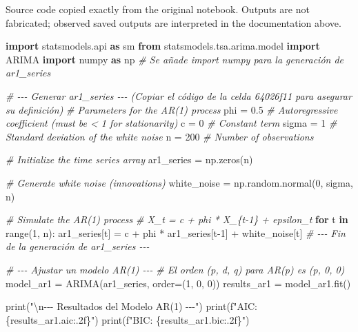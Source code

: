 \documentclass[
  11pt,
]{article}
\newenvironment{Shaded}{}{}
\newcommand{\BuiltInTok}[1]{\textcolor[rgb]{0.00,0.50,0.00}{#1}}
\newcommand{\CharTok}[1]{\textcolor[rgb]{0.25,0.44,0.63}{#1}}
\newcommand{\CommentTok}[1]{\textcolor[rgb]{0.38,0.63,0.69}{\textit{#1}}}
\newcommand{\ControlFlowTok}[1]{\textcolor[rgb]{0.00,0.44,0.13}{\textbf{#1}}}
\newcommand{\DecValTok}[1]{\textcolor[rgb]{0.25,0.63,0.44}{#1}}
\newcommand{\FloatTok}[1]{\textcolor[rgb]{0.25,0.63,0.44}{#1}}
\newcommand{\ImportTok}[1]{\textcolor[rgb]{0.00,0.50,0.00}{\textbf{#1}}}
\newcommand{\KeywordTok}[1]{\textcolor[rgb]{0.00,0.44,0.13}{\textbf{#1}}}
\newcommand{\NormalTok}[1]{#1}
\newcommand{\OperatorTok}[1]{\textcolor[rgb]{0.40,0.40,0.40}{#1}}
\newcommand{\SpecialCharTok}[1]{\textcolor[rgb]{0.25,0.44,0.63}{#1}}
\newcommand{\SpecialStringTok}[1]{\textcolor[rgb]{0.73,0.40,0.53}{#1}}
\newcommand{\StringTok}[1]{\textcolor[rgb]{0.25,0.44,0.63}{#1}}
\begin{document}
Source code copied exactly from the original notebook. Outputs are not fabricated; observed saved outputs are interpreted in the documentation above.

\begin{Shaded}
\begin{Highlighting}[]
\ImportTok{import}\NormalTok{ statsmodels.api }\ImportTok{as}\NormalTok{ sm}
\ImportTok{from}\NormalTok{ statsmodels.tsa.arima.model }\ImportTok{import}\NormalTok{ ARIMA}
\ImportTok{import}\NormalTok{ numpy }\ImportTok{as}\NormalTok{ np }\CommentTok{\# Se añade import numpy para la generación de ar1\_series}

\CommentTok{\# {-}{-}{-} Generar ar1\_series {-}{-}{-} (Copiar el código de la celda 64026f11 para asegurar su definición)}
\CommentTok{\# Parameters for the AR(1) process}
\NormalTok{phi }\OperatorTok{=} \FloatTok{0.5}  \CommentTok{\# Autoregressive coefficient (must be \textless{} 1 for stationarity)}
\NormalTok{c }\OperatorTok{=} \DecValTok{0}    \CommentTok{\# Constant term}
\NormalTok{sigma }\OperatorTok{=} \DecValTok{1}  \CommentTok{\# Standard deviation of the white noise}
\NormalTok{n }\OperatorTok{=} \DecValTok{200}    \CommentTok{\# Number of observations}

\CommentTok{\# Initialize the time series array}
\NormalTok{ar1\_series }\OperatorTok{=}\NormalTok{ np.zeros(n)}

\CommentTok{\# Generate white noise (innovations)}
\NormalTok{white\_noise }\OperatorTok{=}\NormalTok{ np.random.normal(}\DecValTok{0}\NormalTok{, sigma, n)}

\CommentTok{\# Simulate the AR(1) process}
\CommentTok{\# X\_t = c + phi * X\_\{t{-}1\} + epsilon\_t}
\ControlFlowTok{for}\NormalTok{ t }\KeywordTok{in} \BuiltInTok{range}\NormalTok{(}\DecValTok{1}\NormalTok{, n):}
\NormalTok{    ar1\_series[t] }\OperatorTok{=}\NormalTok{ c }\OperatorTok{+}\NormalTok{ phi }\OperatorTok{*}\NormalTok{ ar1\_series[t}\OperatorTok{{-}}\DecValTok{1}\NormalTok{] }\OperatorTok{+}\NormalTok{ white\_noise[t]}
\CommentTok{\# {-}{-}{-} Fin de la generación de ar1\_series {-}{-}{-}}


\CommentTok{\# {-}{-}{-} Ajustar un modelo AR(1) {-}{-}{-}}
\CommentTok{\# El orden (p, d, q) para AR(p) es (p, 0, 0)}
\NormalTok{model\_ar1 }\OperatorTok{=}\NormalTok{ ARIMA(ar1\_series, order}\OperatorTok{=}\NormalTok{(}\DecValTok{1}\NormalTok{, }\DecValTok{0}\NormalTok{, }\DecValTok{0}\NormalTok{))}
\NormalTok{results\_ar1 }\OperatorTok{=}\NormalTok{ model\_ar1.fit()}

\BuiltInTok{print}\NormalTok{(}\StringTok{"}\CharTok{\textbackslash{}n}\StringTok{{-}{-}{-} Resultados del Modelo AR(1) {-}{-}{-}"}\NormalTok{)}
\BuiltInTok{print}\NormalTok{(}\SpecialStringTok{f"AIC: }\SpecialCharTok{\{}\NormalTok{results\_ar1}\SpecialCharTok{.}\NormalTok{aic}\SpecialCharTok{:.2f\}}\SpecialStringTok{"}\NormalTok{)}
\BuiltInTok{print}\NormalTok{(}\SpecialStringTok{f"BIC: }\SpecialCharTok{\{}\NormalTok{results\_ar1}\SpecialCharTok{.}\NormalTok{bic}\SpecialCharTok{:.2f\}}\SpecialStringTok{"}\NormalTok{)}


\end{Highlighting}
\end{Shaded}
\end{document}
